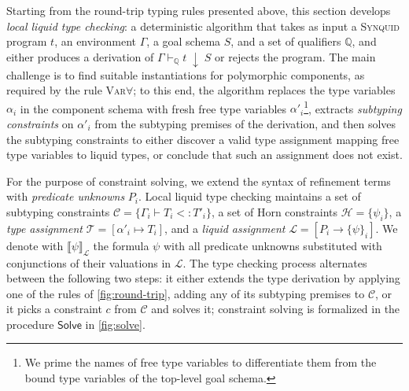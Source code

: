 \documentclass[10pt,preprint]{sigplanconf-pldi16}
\theoremstyle{definition}
\newcommand{\Subt}{<:}
\newcommand{\env}{\Gamma}
\newcommand{\consume}{\;\downarrow\;}
\newcommand{\solve}{\mathsf{Solve}}
\newcommand{\quals}{\mathbb{Q}}
\newcommand{\entailsQ}{\vdash_{\quals}}
\newcommand{\constraints}{\mathcal{C}}
\newcommand{\horns}{\mathcal{H}}
\newcommand{\typeass}{\mathcal{T}}
\newcommand{\liquidass}{\mathcal{L}}
\newcommand{\valuation}[2]{\llbracket{#1}\rrbracket_{#2}}
\newcommand{\lang}{\textsc{Synquid}\xspace}
\begin{document}
Starting from the round-trip typing rules presented above,
this section develops \emph{local liquid type checking}:
a deterministic algorithm that takes as input a \lang program $t$, an environment $\env$, a goal schema $S$, and a set of qualifiers $\quals$,
and either produces a derivation of $\env\entailsQ t\consume S$ or rejects the program.
The main challenge is to find suitable instantiations for polymorphic components, as required by the rule \textsc{Var$\forall$};
to this end, the algorithm replaces the type variables $\alpha_i$ in the component schema with fresh free type variables $\alpha'_i$\footnote{We prime the names of free type variables to differentiate them from the bound type variables of the top-level goal schema.},
extracts \emph{subtyping constraints} on $\alpha'_i$ from the subtyping premises of the derivation,
and then solves the subtyping constraints 
to either discover a valid type assignment mapping free type variables to liquid types, or conclude that such an assignment does not exist.

For the purpose of constraint solving, we extend the syntax of refinement terms with \emph{predicate unknowns} $P_i$.
Local liquid type checking maintains a set of subtyping constraints $\constraints=\{\env_i\vdash T_i\Subt T'_i\}$,
a set of Horn constraints $\horns=\{\psi_i\}$,
a \emph{type assignment} $\typeass=[\alpha'_i \mapsto T_i]$,
and a \emph{liquid assignment} $\liquidass=[P_i \to \{\psi\}_i]$.
We denote with $\valuation{\psi}{\liquidass}$ the formula $\psi$ with all predicate unknowns substituted with conjunctions of their valuations in $\liquidass$.
The type checking process alternates between the following two steps:
it either extends the type derivation by applying one of the rules of \autoref{fig:round-trip},
adding any of its subtyping premises to $\constraints$,
or it picks a constraint $c$ from $\constraints$ and solves it;
constraint solving is formalized in the procedure $\solve$ in \autoref{fig:solve}.
\end{document}
